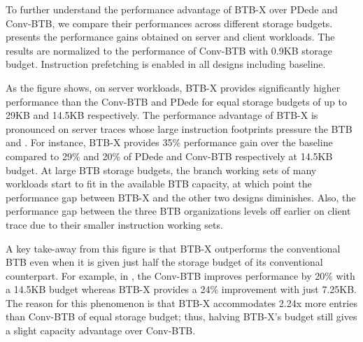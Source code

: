To further understand the performance advantage of BTB-X over PDede and Conv-BTB, we compare their performances across different storage budgets.  presents the performance gains obtained on server and client workloads. The results are normalized to the performance of Conv-BTB with 0.9KB storage budget. Instruction prefetching is enabled in all designs including baseline.

As the figure shows, on server workloads, BTB-X provides significantly higher performance than the Conv-BTB and PDede for equal storage budgets of up to 29KB and 14.5KB respectively. The performance advantage of BTB-X is pronounced on server traces whose large instruction footprints pressure the BTB and . For instance, BTB-X provides 35\% performance gain over the baseline compared to 29\% and 20\% of PDede and Conv-BTB respectively at 14.5KB budget. At large BTB storage budgets, the branch working sets of many workloads start to fit in the available BTB capacity, at which point the performance gap between BTB-X and the other two designs diminishes. Also, the performance gap between the three BTB organizations levels off earlier on client trace due to their smaller instruction working sets.

A key take-away from this figure is that BTB-X outperforms the conventional BTB even when it is given just half the storage budget of its conventional counterpart. For example, in , the Conv-BTB improves performance by 20\% with a 14.5KB budget whereas BTB-X provides a 24\% improvement with just 7.25KB. The reason for this phenomenon is that BTB-X accommodates 2.24x more entries than Conv-BTB of equal storage budget; thus, halving BTB-X's budget still gives a slight capacity advantage over Conv-BTB.


